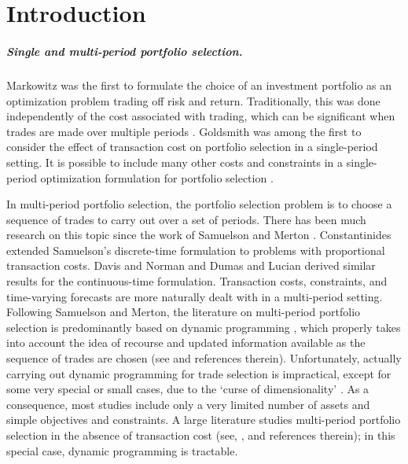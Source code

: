 \documentclass[openany]{article}  %
\begin{document}
\chapter{Introduction}

\paragraph{Single and multi-period portfolio selection.}
Markowitz \cite{markowitz1952portfolio} was the first to formulate the choice of an
investment portfolio as an optimization problem trading off risk and return.
Traditionally, this was done independently of the cost associated
with trading, which can be significant when trades are made over
multiple periods \cite{kolm2014years}.
Goldsmith \cite{goldsmith1976transactions} was among the first to consider the
effect of transaction cost on portfolio selection in a single-period setting.
It is possible to include many other costs and constraints in a single-period
optimization formulation for portfolio selection \cite{lobo2007portfolio,moallemi2015dynamic}.

In multi-period portfolio selection, the portfolio selection problem is to choose
a sequence of trades to carry out over a set of periods.
There has been much research on this topic since the work of
Samuelson \cite{samuelson1969liftetime} and
Merton \cite{merton1969lifetime, merton1971optimum}.
Constantinides \cite{constantinides1979multiperiod} extended Samuelson's
discrete-time formulation to problems with proportional transaction costs.
Davis and Norman \cite{davis1990portfolio} and Dumas and Lucian \cite{dumas1991exact}
derived similar results for the continuous-time formulation.
Transaction costs, constraints, and time-varying forecasts are more
naturally dealt with in a multi-period setting.
Following Samuelson and Merton, the literature on multi-period portfolio selection is
predominantly based on dynamic programming \cite{bellman1956dynamic, bertsekas1995dynamic}, which properly takes into
account the idea of recourse and updated information available as the sequence of
trades are chosen (see \cite{garleanu2013dynamic} and references therein).
Unfortunately, actually carrying out dynamic programming
for trade selection is impractical, except for some very special or small cases,
due to the `curse of dimensionality'  \cite{powell2007approximate,boyd2014performance}.
As a consequence, most studies include only a very limited number of assets
and simple objectives and constraints.
A large literature studies multi-period portfolio selection
in the absence of transaction cost (see, \eg, \cite{campbell2002strategic} and
references therein); in this special case, dynamic programming is tractable.
\end{document}
